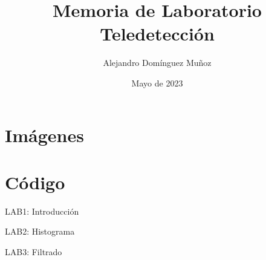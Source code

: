 \documentclass{beamer}
\title{
    Memoria de Laboratorio \\
    \large Teledetección
}
\author{Alejandro Domínguez Muñoz}
\institute{Universidad de Sevilla}
\date{Mayo de 2023}
\begin{document}
\frame{\titlepage}

\section{Imágenes}



\section{Código}

\begin{frame}{LAB1: Introducción}
\only<1>{

}
\only<2>{

}
\end{frame}

\begin{frame}{LAB2: Histograma}
\only<2>{


}
\only<3>{

}
\only<4>{

}
\end{frame}

\begin{frame}{LAB3: Filtrado}
\only<2>{

}
\only<3>{

}
\only<4>{

}
\end{frame}
\end{document}
